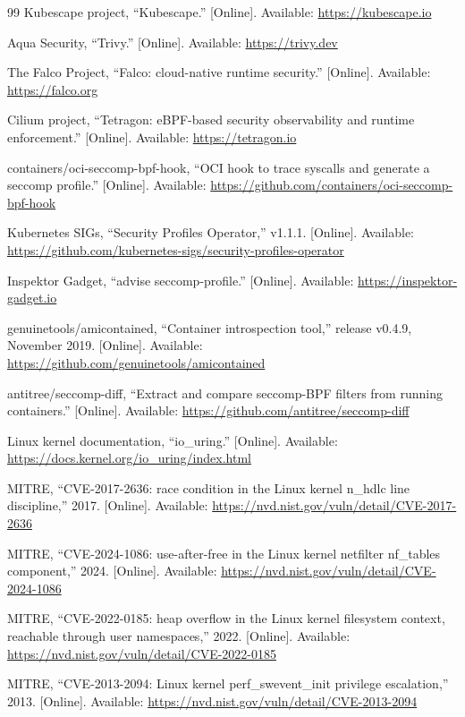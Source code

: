 \begin{thebibliography}{99}
 Kubescape project, ``Kubescape.'' [Online]. Available: \url{https://kubescape.io}

 Aqua Security, ``Trivy.'' [Online]. Available: \url{https://trivy.dev}

 The Falco Project, ``Falco: cloud-native runtime security.'' [Online]. Available: \url{https://falco.org}

 Cilium project, ``Tetragon: eBPF-based security observability and runtime enforcement.'' [Online]. Available: \url{https://tetragon.io}

 containers/oci-seccomp-bpf-hook, ``OCI hook to trace syscalls and generate a seccomp profile.'' [Online]. Available: \url{https://github.com/containers/oci-seccomp-bpf-hook}

 Kubernetes SIGs, ``Security Profiles Operator,'' v1.1.1. [Online]. Available: \url{https://github.com/kubernetes-sigs/security-profiles-operator}

 Inspektor Gadget, ``advise seccomp-profile.'' [Online]. Available: \url{https://inspektor-gadget.io}

 genuinetools/amicontained, ``Container introspection tool,'' release v0.4.9, November 2019. [Online]. Available: \url{https://github.com/genuinetools/amicontained}

 antitree/seccomp-diff, ``Extract and compare seccomp-BPF filters from running containers.'' [Online]. Available: \url{https://github.com/antitree/seccomp-diff}

 Linux kernel documentation, ``io\_uring.'' [Online]. Available: \url{https://docs.kernel.org/io_uring/index.html}

 MITRE, ``CVE-2017-2636: race condition in the Linux kernel n\_hdlc line discipline,'' 2017. [Online]. Available: \url{https://nvd.nist.gov/vuln/detail/CVE-2017-2636}

 MITRE, ``CVE-2024-1086: use-after-free in the Linux kernel netfilter nf\_tables component,'' 2024. [Online]. Available: \url{https://nvd.nist.gov/vuln/detail/CVE-2024-1086}

 MITRE, ``CVE-2022-0185: heap overflow in the Linux kernel filesystem context, reachable through user namespaces,'' 2022. [Online]. Available: \url{https://nvd.nist.gov/vuln/detail/CVE-2022-0185}

 MITRE, ``CVE-2013-2094: Linux kernel perf\_swevent\_init privilege escalation,'' 2013. [Online]. Available: \url{https://nvd.nist.gov/vuln/detail/CVE-2013-2094}


\end{thebibliography}

